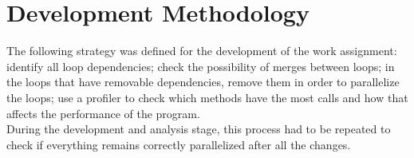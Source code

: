 \documentclass[10pt,journal,compsoc]{IEEEtran}
\begin{document}
%


\section{Development Methodology}
The following strategy was defined for the development of the work assignment: identify all loop dependencies; check the possibility of merges between loops; in the loops that have removable dependencies, remove them in order to parallelize the loops; use a profiler to check which methods have the most calls and how that affects the performance of the program. 
\\
During the development and analysis stage, this process had to be repeated to check if everything remains correctly parallelized after all the changes.
\end{document}
